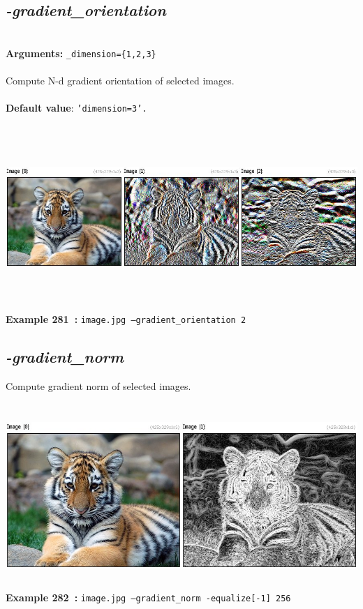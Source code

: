 \documentclass[a4paper,11pt,twoside]{book}
\begin{document}
\subsection{\emph{-gradient\_orientation} }\vspace*{-0.5em}
~\\\textbf{Arguments: } 
{\small \texttt{\_dimension=\{1,2,3\}}}\\~\\
Compute N-d gradient orientation of selected images.
~\\~\\\textbf{Default value}: {\small \texttt{'dimension=3'.}}
\begin{center}\includegraphics[keepaspectratio=true,height=7cm,width=\textwidth]{img/gmic_def281.jpg}\\
{\footnotesize \textbf{Example 281~:} \texttt{image.jpg --gradient\_orientation 2}}
\end{center}

\subsection{\emph{-gradient\_norm} }\vspace*{-0.5em}
Compute gradient norm of selected images.
\begin{center}\includegraphics[keepaspectratio=true,height=7cm,width=\textwidth]{img/gmic_def282.jpg}\\
{\footnotesize \textbf{Example 282~:} \texttt{image.jpg --gradient\_norm -equalize[-1] 256}}
\end{center}
\end{document}
